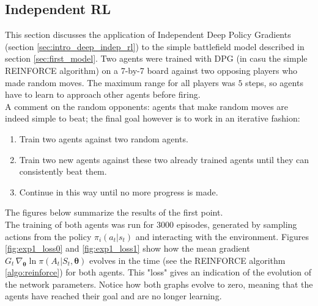 \subsection{Independent RL}
\label{sec:iql_applied}
This section discusses the application of Independent Deep Policy Gradients (section \ref{sec:intro_deep_indep_rl}) to the simple battlefield model described in section \ref{sec:first_model}. Two agents were trained with DPG (in casu the simple REINFORCE algorithm) on a 7-by-7 board against two opposing players who made random moves. The maximum range for all players was $5$ steps, so agents have to learn to approach other agents before firing.\\
A comment on the random opponents: agents that make random moves are indeed simple to beat; the final goal however is to work in an iterative fashion: 
\begin{enumerate}
    \item Train two agents against two random agents.
    \item Train two new agents against these two already trained agents until they can consistently beat them.
    \item Continue in this way until no more progress is made.
\end{enumerate}
The figures below summarize the results of the first point.\\
The training of both agents was run for 3000 episodes, generated by sampling actions from the policy $\pi_i(a_t|s_t)$ and interacting with the environment. Figures \ref{fig:exp1_loss0} and \ref{fig:exp1_loss1} show how the mean gradient $G_t \, \nabla_{\bm{\theta}} \ln \pi(A_t|S_t,\bm{\theta})$ evolves in the time (see the REINFORCE algorithm \ref{algo:reinforce}) for both agents. This "loss" gives an indication of the evolution of the network parameters. Notice how both graphs evolve to zero, meaning that the agents have reached their goal and are no longer learning.\\
